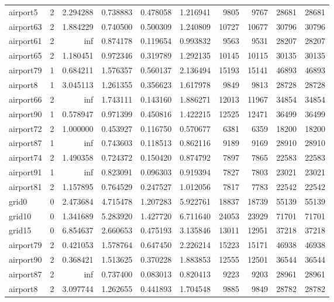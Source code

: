 \begin{longtable}{|l|r|r|r|r|r|r|r|r|r|}
airport5 & 2 & 2.294288 & 0.738883 & 0.478058 & 1.216941 & 9805 & 9767 & 28681 & 28681 \\
airport63 & 2 & 1.884229 & 0.740500 & 0.500309 & 1.240809 & 10727 & 10677 & 30796 & 30796 \\
airport61 & 2 & inf & 0.874178 & 0.119654 & 0.993832 & 9563 & 9531 & 28207 & 28207 \\
airport65 & 2 & 1.180451 & 0.972346 & 0.319789 & 1.292135 & 10145 & 10115 & 30135 & 30135 \\
airport79 & 1 & 0.684211 & 1.576357 & 0.560137 & 2.136494 & 15193 & 15141 & 46893 & 46893 \\
airport8 & 1 & 3.045113 & 1.261355 & 0.356623 & 1.617978 & 9849 & 9813 & 28728 & 28728 \\
airport66 & 2 & inf & 1.743111 & 0.143160 & 1.886271 & 12013 & 11967 & 34854 & 34854 \\
airport90 & 1 & 0.578947 & 0.971399 & 0.450816 & 1.422215 & 12525 & 12471 & 36499 & 36499 \\
airport72 & 2 & 1.000000 & 0.453927 & 0.116750 & 0.570677 & 6381 & 6359 & 18200 & 18200 \\
airport87 & 1 & inf & 0.743603 & 0.118513 & 0.862116 & 9189 & 9169 & 28910 & 28910 \\
airport74 & 2 & 1.490358 & 0.724372 & 0.150420 & 0.874792 & 7897 & 7865 & 22583 & 22583 \\
airport91 & 1 & inf & 0.823091 & 0.096303 & 0.919394 & 7827 & 7803 & 23021 & 23021 \\
airport81 & 2 & 1.157895 & 0.764529 & 0.247527 & 1.012056 & 7817 & 7783 & 22542 & 22542 \\
grid0 & 0 & 2.473684 & 4.715478 & 1.207283 & 5.922761 & 18837 & 18739 & 55139 & 55139 \\
grid10 & 0 & 1.341689 & 5.283920 & 1.427720 & 6.711640 & 24053 & 23929 & 71701 & 71701 \\
grid15 & 0 & 6.854637 & 2.660653 & 0.475193 & 3.135846 & 13011 & 12951 & 37218 & 37218 \\
airport79 & 2 & 0.421053 & 1.578764 & 0.647450 & 2.226214 & 15223 & 15171 & 46938 & 46938 \\
airport90 & 2 & 0.368421 & 1.513625 & 0.370228 & 1.883853 & 12555 & 12501 & 36544 & 36544 \\
airport87 & 2 & inf & 0.737400 & 0.083013 & 0.820413 & 9223 & 9203 & 28961 & 28961 \\
airport8 & 2 & 3.097744 & 1.262655 & 0.441893 & 1.704548 & 9885 & 9849 & 28782 & 28782 \\

\end{longtable}
